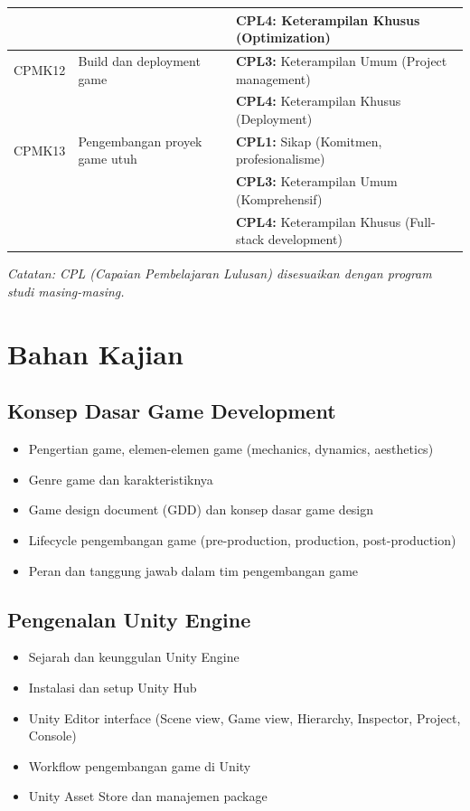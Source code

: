 \documentclass[a4paper,12pt]{article}
\begin{document}
\begin{table}[h]
\begin{tabular}{|p{1.5cm}|p{7cm}|p{6cm}|}
 & & \textbf{CPL4:} Keterampilan Khusus (Optimization) \\
\hline
CPMK12 & Build dan deployment game & \textbf{CPL3:} Keterampilan Umum (Project management) \\
 & & \textbf{CPL4:} Keterampilan Khusus (Deployment) \\
\hline
CPMK13 & Pengembangan proyek game utuh & \textbf{CPL1:} Sikap (Komitmen, profesionalisme) \\
 & & \textbf{CPL3:} Keterampilan Umum (Komprehensif) \\
 & & \textbf{CPL4:} Keterampilan Khusus (Full-stack development) \\
\hline
\end{tabular}
\end{table}

\textit{Catatan: CPL (Capaian Pembelajaran Lulusan) disesuaikan dengan program studi masing-masing.}

\section{Bahan Kajian}

\subsection{Konsep Dasar Game Development}
\begin{itemize}
\item Pengertian game, elemen-elemen game (mechanics, dynamics, aesthetics)
\item Genre game dan karakteristiknya
\item Game design document (GDD) dan konsep dasar game design
\item Lifecycle pengembangan game (pre-production, production, post-production)
\item Peran dan tanggung jawab dalam tim pengembangan game
\end{itemize}

\subsection{Pengenalan Unity Engine}
\begin{itemize}
\item Sejarah dan keunggulan Unity Engine
\item Instalasi dan setup Unity Hub
\item Unity Editor interface (Scene view, Game view, Hierarchy, Inspector, Project, Console)
\item Workflow pengembangan game di Unity
\item Unity Asset Store dan manajemen package
\end{itemize}
\end{document}
